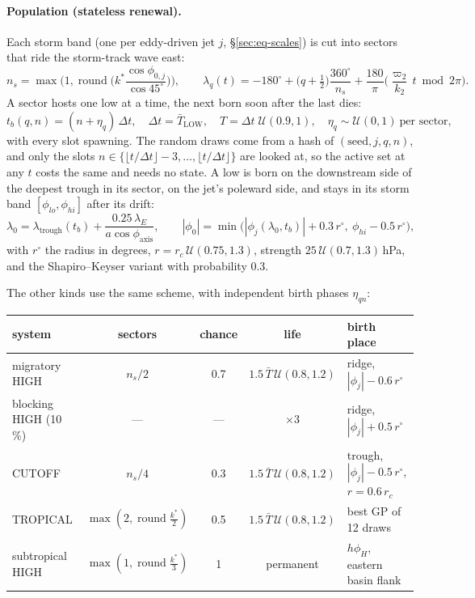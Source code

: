 \documentclass[11pt,a4paper]{article}
\begin{document}
\paragraph{Population (stateless renewal).}
Each storm band (one per eddy-driven jet $j$, \S\ref{sec:eq-scales}) is cut into sectors
that ride the storm-track wave east:
\begin{equation}
  n_s=\max\!\Big(1,\operatorname{round}\Big(k^*\frac{\cos\phi_{0,j}}{\cos45^\circ}\Big)\Big),\qquad
  \lambda_q(t)=-180^\circ+\big(q+\tfrac12\big)\frac{360^\circ}{n_s}
  +\frac{180}{\pi}\Big(\frac{\varpi_2}{k_2}\,t \bmod 2\pi\Big).
\end{equation}
A sector hosts one low at a time, the next born soon after the last dies:
\begin{equation}
  t_b(q,n)=(n+\eta_q)\,\Delta t,\quad \Delta t=\bar T_{\mathrm{LOW}},\quad
  T=\Delta t\;\mathcal{U}(0.9,1),\quad \eta_q\sim\mathcal{U}(0,1)\ \text{per sector},
\end{equation}
with every slot spawning. The random draws come from a hash of $(\mathrm{seed},j,q,n)$, and
only the slots $n\in\{\lfloor t/\Delta t\rfloor-3,\dots,\lfloor t/\Delta t\rfloor\}$ are
looked at, so the active set at any $t$ costs the same and needs no state. A low is born on the
downstream side of the deepest trough in its sector, on the jet's poleward side, and stays in
its storm band $[\phi_{lo},\phi_{hi}]$ after its drift:
\begin{equation}
  \lambda_0=\lambda_{\mathrm{trough}}(t_b)+\frac{0.25\,\lambda_E}{a\cos\phi_{\mathrm{axis}}},\qquad
  |\phi_0| = \min\!\big(|\phi_j(\lambda_0,t_b)|+0.3\,r^\circ,\ \phi_{hi}-0.5\,r^\circ\big),
\end{equation}
with $r^\circ$ the radius in degrees, $r=r_c\,\mathcal{U}(0.75,1.3)$, strength
$25\,\mathcal{U}(0.7,1.3)$\,hPa, and the Shapiro--Keyser variant with probability 0.3.

The other kinds use the same scheme, with independent birth phases $\eta_{qn}$:

\begin{center}
\small
\begin{tabular}{lcccp{4.2cm}}
\toprule
system & sectors & chance & life & birth place\\
\midrule
migratory HIGH & $n_s/2$ & 0.7 & $1.5\,\bar T\,\mathcal{U}(0.8,1.2)$ & ridge, $|\phi_j|-0.6\,r^\circ$\\
blocking HIGH (10\,\%) & --- & --- & $\times3$ & ridge, $|\phi_j|+0.5\,r^\circ$\\
CUTOFF & $n_s/4$ & 0.3 & $1.5\,\bar T\,\mathcal{U}(0.8,1.2)$ & trough, $|\phi_j|-0.5\,r^\circ$, $r=0.6\,r_c$\\
TROPICAL & $\max(2,\operatorname{round}\frac{k^*}{2})$ & 0.5 & $1.5\,\bar T\,\mathcal{U}(0.8,1.2)$ & best GP of 12 draws\\
subtropical HIGH & $\max(1,\operatorname{round}\frac{k^*}{3})$ & 1 & permanent & $h\phi_H$, eastern basin flank\\
\bottomrule
\end{tabular}
\end{center}
\end{document}
